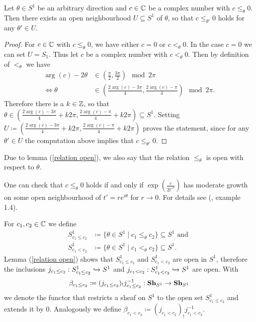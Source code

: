 \begin{lem}\label{relation open}
Let $\theta \in S^1$ be an arbitrary direction and $c \in \mathbb{C}$ be a complex number with $c \leq_{\theta} 0$. 
   Then there exists an open neighbourhood $U \subseteq S^1$ of $\theta$, so that $c \leq_{\theta'} 0$ holds for any $\theta' \in U$.
\end{lem}   
\begin{proof} For $c \in \mathbb{C}$ with $c \leq_{\theta} 0$, we have either $c = 0$ or $c <_{\theta}0$.
    In the case $c = 0$ we can set $U = S_1$. Thus let $c$ be a complex number with $c <_{\theta} 0$. Then by definition of $<_{\theta}$ we have 
    \begin{align*}
        \arg(c) - 2 \theta & \in \left(\frac{\pi}{2}, \frac{3\pi}{2}\right) \mod 2 \pi \\
        \Longleftrightarrow \theta &\in \left(\frac{2\arg(c)-3\pi}{4}, \frac{2\arg(c)-\pi}{4}\right) \mod 2\pi.
    \end{align*}
    Therefore there is a $k \in \mathbb{Z}$, so that $\theta \in \left(\frac{2\arg(c)-3\pi}{4} + k2\pi, \frac{2\arg(c)-\pi}{4}+k2\pi\right)\subseteq S^1$. Setting $U \coloneqq \left(\frac{2\arg(c)-3\pi}{4} + k2\pi, \frac{2\arg(c)-\pi}{4}+k2\pi\right)$ proves the statement, since for any $\theta' \in U$ the computation above implies that $c \leq_{\theta'} 0$.
\end{proof}
Due to lemma (\ref{relation open}), we also say that the relation $\leq_{\theta}$ is open with respect to $\theta$.
\begin{rem}
    One can check that $c\leq_{\theta} 0$ holds if and only if $\exp(\frac{c}{2t'^2})$ has moderate growth on some open neighbourhood of $t'=re^{i\theta}$ for $r \to 0$. For details see (\cite{Sabbah_StokesStructures}, example 1.4).
\end{rem}


\begin{nota}
    For $c_1, c_2 \in \mathbb{C}$ we define 
    \begin{align*}
    S_{c_1 \leq c_2}^1 & \coloneqq \{\theta \in S^1 \mid c_1 \leq_\theta c_2\} \subseteq S^1 \text{ and }\\ 
    S_{c_1 < c_2}^1 & \coloneqq \{ \theta \in S^1 \mid c_1 <_\theta c_2 \} \subseteq S^1.
    \end{align*}
    Lemma (\ref{relation open}) shows that $S_{c_1 \leq c_2}^1$ and $S_{c_1 < c_2}^1$ are open in $S^1$, therefore the inclusions $j_{c_1\leq c_2}: S^1_{c_1 \leq c_2} \xhookrightarrow{} S^1$ and $j_{c_1 < c_2}:S^1_{c_1 < c_2} \xhookrightarrow{} S^1$ are open. With 
    \[
        \beta_{c_1 \leq c_2}  \coloneqq (j_{c_1 \leq c_2})_!j^{-1}_{c_1 \leq c_2}: \mathbf{Sh}_{S^1} \to \mathbf{Sh}_{S^1}
    \]
    we denote the functor that restricts a sheaf on $S^1$ to the open set $S^1_{c_1 \leq c_2}$  and extends it by 0. Analogously we define $\beta_{c_1 < c_2} \coloneqq  (j_{c_1 < c_2})_!j^{-1}_{c_1 < c_2}$.
\end{nota}

